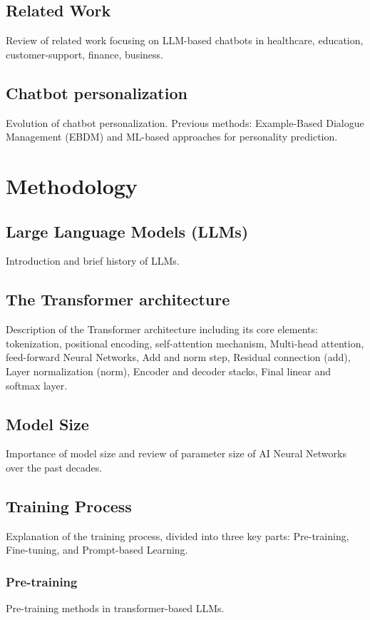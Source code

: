 \documentclass[12pt]{article}
\begin{document}
\subsection{Related Work}
Review of related work focusing on LLM-based chatbots in healthcare, education, customer-support, finance, business.

\subsection{Chatbot personalization}
Evolution of chatbot personalization. Previous methods: Example-Based Dialogue Management (EBDM) and ML-based approaches for personality prediction.

\section{Methodology}
\subsection{Large Language Models (LLMs)}
Introduction and brief history of LLMs.

\subsection{The Transformer architecture}
Description of the Transformer architecture including its core elements: tokenization, positional encoding, self-attention mechanism, Multi-head attention, feed-forward Neural Networks, Add and norm step, Residual connection (add), Layer normalization (norm), Encoder and decoder stacks, Final linear and softmax layer.

\subsection{Model Size}
Importance of model size and review of parameter size of AI Neural Networks over the past decades.

\subsection{Training Process}
Explanation of the training process, divided into three key parts: Pre-training, Fine-tuning, and Prompt-based Learning.

\subsubsection{Pre-training}
Pre-training methods in transformer-based LLMs.
\end{document}
